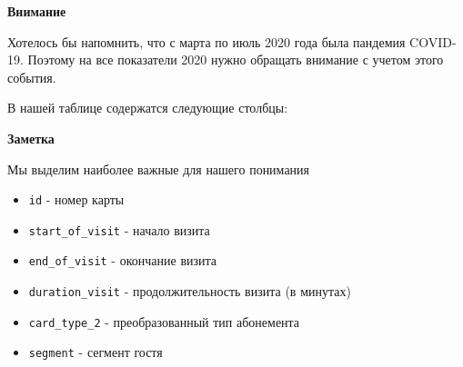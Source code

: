 \documentclass[
  letterpaper,
  DIV=11,
  numbers=noendperiod]{scrartcl}
\begin{document}
\begin{tcolorbox}[enhanced jigsaw, colframe=quarto-callout-warning-color-frame, leftrule=.75mm, rightrule=.15mm, toprule=.15mm, left=2mm, arc=.35mm, bottomrule=.15mm, colback=white, breakable, opacityback=0]
\begin{minipage}[t]{5.5mm}
\textcolor{quarto-callout-warning-color}{\faExclamationTriangle}
\end{minipage}%
\begin{minipage}[t]{\textwidth - 5.5mm}

\textbf{Внимание}\vspace{2mm}

Хотелось бы напомнить, что с марта по июль 2020 года была пандемия
COVID-19. Поэтому на все показатели 2020 нужно обращать внимание с
учетом этого события.

\end{minipage}%
\end{tcolorbox}

В нашей таблице содержатся следующие столбцы:

\begin{tcolorbox}[enhanced jigsaw, colframe=quarto-callout-note-color-frame, leftrule=.75mm, rightrule=.15mm, toprule=.15mm, left=2mm, arc=.35mm, bottomrule=.15mm, colback=white, breakable, opacityback=0]
\begin{minipage}[t]{5.5mm}
\textcolor{quarto-callout-note-color}{\faInfo}
\end{minipage}%
\begin{minipage}[t]{\textwidth - 5.5mm}

\textbf{Заметка}\vspace{2mm}

Мы выделим наиболее важные для нашего понимания

\end{minipage}%
\end{tcolorbox}

\begin{itemize}
\item
  \texttt{id} - номер карты
\item
  \texttt{start\_of\_visit} - начало визита
\item
  \texttt{end\_of\_visit} - окончание визита
\item
  \texttt{duration\_visit} - продолжительность визита (в минутах)
\item
  \texttt{сard\_type\_2} - преобразованный тип абонемента
\item
  \texttt{segment} - сегмент гостя
\end{itemize}
\end{document}
